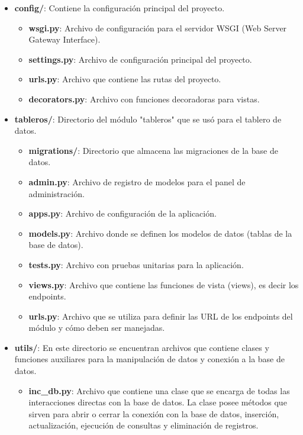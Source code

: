 \begin{itemize}[]
  \item \textbf{config/}: Contiene la configuración principal del proyecto.
  \begin{itemize}[]
    \item \textbf{wsgi.py}: Archivo de configuración para el servidor WSGI (Web Server Gateway Interface).
    \item \textbf{settings.py}: Archivo de configuración principal del proyecto.
    \item \textbf{urls.py}: Archivo que contiene las rutas del proyecto.
    \item \textbf{decorators.py}: Archivo con funciones decoradoras para vistas.
  \end{itemize}

  \item \textbf{tableros/}: Directorio del módulo "tableros" que se usó para el tablero de datos.
  \begin{itemize}
    \item \textbf{migrations/}: Directorio que almacena las migraciones de la base de datos.
    \item \textbf{admin.py}: Archivo de registro de modelos para el panel de administración.
    \item \textbf{apps.py}: Archivo de configuración de la aplicación.
    \item \textbf{models.py}: Archivo donde se definen los modelos de datos (tablas de la base de datos).
    \item \textbf{tests.py}: Archivo con pruebas unitarias para la aplicación.
    \item \textbf{views.py}: Archivo que contiene las funciones de vista (views), es decir los endpoints.
    \item \textbf{urls.py}: Archivo que se utiliza para definir las URL de los endpoints del módulo y cómo deben ser manejadas. 
  \end{itemize}

  \item \textbf{utils/}: En este directorio se encuentran archivos que contiene clases y funciones auxiliares para la manipulación de datos y conexión a la base de datos.

  \begin{itemize}
      \item \textbf{inc\_db.py}: Archivo que contiene una clase que se encarga de todas las interacciones directas con la base de datos. La clase posee métodos que sirven para abrir o cerrar la conexión con la base de datos, inserción, actualización, ejecución de consultas y eliminación de registros.


\end{itemize}
\end{itemize}
